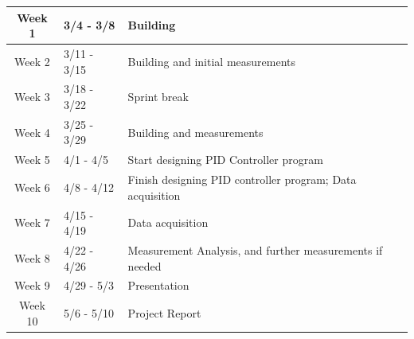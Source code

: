 \documentclass[aps,prstab,reprint,12pt]{revtex4-1}
\newcommand{\appendixpdf}[3]{
    
    
}
\begin{document}
\begin{center}
    \begin{tabular}{|c|l|l|}\hline
    Week  1 & 3/4  - 3/8  & Building \\\hline
    Week  2 & 3/11 - 3/15 & Building and initial measurements \\\hline
    Week  3 & 3/18 - 3/22 & Sprint break \\\hline
    Week  4 & 3/25 - 3/29 & Building and measurements \\\hline
    Week  5 & 4/1  - 4/5  & Start designing PID Controller program \\\hline
    Week  6 & 4/8  - 4/12 & Finish designing PID controller program; Data acquisition \\\hline
    Week  7 & 4/15 - 4/19 & Data acquisition \\\hline
    Week  8 & 4/22 - 4/26 & Measurement Analysis, and further measurements if needed \\\hline
    Week  9 & 4/29 - 5/3  & Presentation \\\hline
    Week 10 & 5/6  - 5/10 & Project Report \\\hline
  \end{tabular}
\end{center}

 






\end{document}
